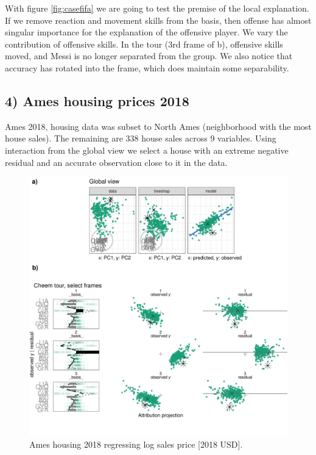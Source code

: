 \documentclass[
]{article}
\begin{document}
With figure \ref{fig:casefifa} we are going to test the premise of the local explanation. If we remove reaction and movement skills from the basis, then offense has almost singular importance for the explanation of the offensive player. We vary the contribution of offensive skills. In the tour (3rd frame of b), offensive skills moved, and Messi is no longer separated from the group. We also notice that accuracy has rotated into the frame, which does maintain some separability.

\hypertarget{ames-housing-prices-2018}{%
\subsection{4) Ames housing prices 2018}\label{ames-housing-prices-2018}}

Ames 2018, housing data was subset to North Ames (neighborhood with the most house sales). The remaining are 338 house sales across 9 variables. Using interaction from the global view we select a house with an extreme negative residual and an accurate observation close to it in the data.

\begin{figure}

{\centering \includegraphics[width=1\linewidth]{./figures/case_ames2018} 

}

\caption{Ames housing 2018 regressing log sales price [2018 USD].}\label{fig:caseames}
\end{figure}
\end{document}
